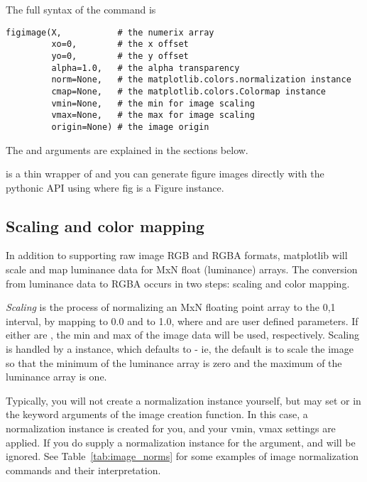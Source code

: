 \documentclass[]{book}
\begin{document}
The full syntax of the  command is

\begin{lstlisting}
figimage(X,           # the numerix array
         xo=0,        # the x offset
         yo=0,        # the y offset
         alpha=1.0,   # the alpha transparency
         norm=None,   # the matplotlib.colors.normalization instance
         cmap=None,   # the matplotlib.colors.Colormap instance
         vmin=None,   # the min for image scaling 
         vmax=None,   # the max for image scaling 
         origin=None) # the image origin
\end{lstlisting}

The  and  arguments are
explained in the sections below.

 is a thin wrapper of
 and you can generate figure images
directly with the pythonic API using  where
fig is a Figure instance.

\subsection{Scaling and color mapping}
\label{sec:image_to_rgba}

In addition to supporting raw image RGB and RGBA formats, matplotlib
will scale and map luminance data for MxN float (luminance) arrays.
The conversion from luminance data to RGBA occurs in two steps:
scaling and color mapping.

\textit{Scaling} is the process of normalizing an MxN floating point
array to the 0,1 interval, by mapping  to 0.0 and
 to 1.0, where  and  are user defined
parameters.  If either are , the min and max of the image
data will be used, respectively.  Scaling is handled by a
 instance, which defaults to
 - ie, the default is to
scale the image so that the minimum of the luminance array is zero and
the maximum of the luminance array is one. 

Typically, you will not create a normalization instance yourself, but
may set  or  in the keyword arguments of the
image creation function.  In this case, a normalization instance is
created for you, and your vmin, vmax settings are applied.  If you do
supply a normalization instance for the  argument,
 and  will be ignored.  See
Table~\ref{tab:image_norms} for some examples of image normalization
commands and their interpretation.
\end{document}
